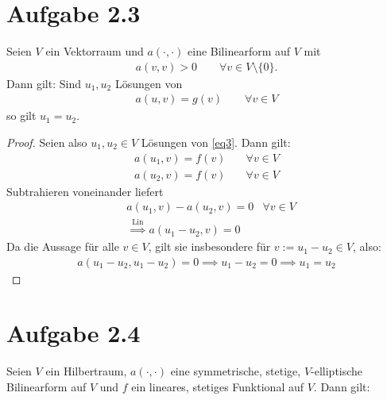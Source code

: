 \documentclass[12pt,a4paper]{article}
\begin{document}
\section*{Aufgabe 2.3}
Seien $V$ ein Vektorraum und $a(\cdot,\cdot)$ eine Bilinearform auf $V$ mit
\begin{align*}
a(v,v)>0\qquad\forall v\in V\setminus\lbrace0\rbrace.
\end{align*}
Dann gilt: Sind $u_1,u_2$ Lösungen von
\begin{align}\label{eq3}
a(u,v)=g(v)\qquad\forall v\in V
\end{align}
so gilt $u_1=u_2$.

\begin{proof}
Seien also $u_1,u_2\in V$ Lösungen von \eqref{eq3}. Dann gilt:
\begin{align*}
a(u_1,v)=f(v) \quad&\forall v\in V\\
a(u_2,v)=f(v) \quad&\forall v\in V
\end{align*}
Subtrahieren voneinander liefert
\begin{align*}
&a(u_1,v)-a(u_2,v)=0 &\forall v\in V\\
&\stackrel{\text{Lin}}{\implies}
a(u_1-u_2,v)=0
\end{align*}
Da die Aussage für alle $v\in V$, gilt sie insbesondere für $v:=u_1-u_2\in V$, also:
\begin{align*}
a(u_1-u_2,u_1-u_2)=0\implies u_1-u_2=0\implies u_1=u_2
\end{align*}
\end{proof}


\section*{Aufgabe 2.4}
Seien $V$ ein Hilbertraum, $a(\cdot,\cdot)$ eine symmetrische, stetige, $V$-elliptische Bilinearform auf $V$ und $f$ ein lineares, stetiges Funktional auf $V$. Dann gilt:
\end{document}
